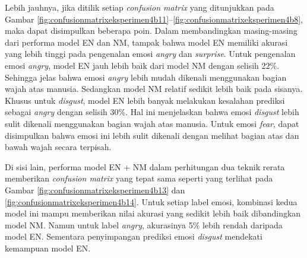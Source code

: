 Lebih jauhnya, jika ditilik setiap \emph{confusion matrix} yang ditunjukkan pada Gambar \ref{fig:confusionmatrixeksperimen4b11}--\ref{fig:confusionmatrixeksperimen4b8}, maka dapat disimpulkan beberapa poin. Dalam membandingkan masing-masing dari performa model EN dan NM, tampak bahwa model EN memiliki akurasi yang lebih tinggi pada pengenalan emosi \textit{angry} dan \textit{surprise}. Untuk pengenalan emosi \textit{angry}, model EN jauh lebih baik dari model NM dengan selisih 22\%. Sehingga jelas bahwa emosi \textit{angry} lebih mudah dikenali menggunakan bagian wajah atas manusia. Sedangkan model NM relatif sedikit lebih baik pada sisanya. Khusus untuk \textit{disgust}, model EN lebih banyak melakukan kesalahan prediksi sebagai \textit{angry} dengan selisih 30\%. Hal ini menjelaskan bahwa emosi \textit{disgust} lebih sulit dikenali menggunakan bagian wajah atas manusia. Untuk emosi \textit{fear}, dapat disimpulkan bahwa emosi ini lebih sulit dikenali dengan melihat bagian atas dan bawah wajah secara terpisah.

Di sisi lain, performa model EN + NM dalam perhitungan dua teknik rerata memberikan \textit{confusion matrix} yang tepat sama seperti yang terlihat pada Gambar \ref{fig:confusionmatrixeksperimen4b13} dan \ref{fig:confusionmatrixeksperimen4b14}. Untuk setiap label emosi, kombinasi kedua model ini mampu memberikan nilai akurasi yang sedikit lebih baik dibandingkan model NM. Namun untuk label \textit{angry}, akurasinya 5\% lebih rendah daripada model EN. Sementara penyimpangan prediksi emosi \textit{disgust} mendekati kemampuan model EN.

